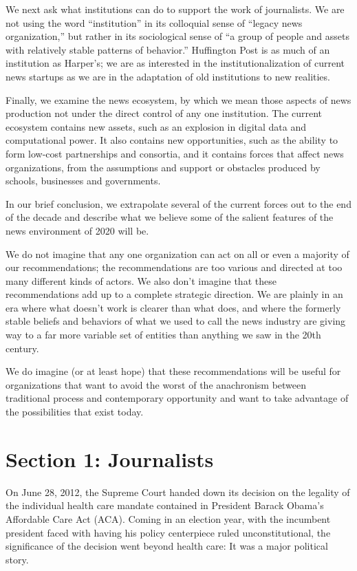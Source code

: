 We next ask what institutions can do to support the work of journalists. We are
not using the word ``institution'' in its colloquial sense of ``legacy news organization,''
but rather in its sociological sense of ``a group of people and assets with
relatively stable patterns of behavior.'' Huffington Post is as much of an institution
as Harper’s; we are as interested in the institutionalization of current news
startups as we are in the adaptation of old institutions to new realities.

Finally, we examine the news ecosystem, by which we mean those aspects of
news production not under the direct control of any one institution. The current
ecosystem contains new assets, such as an explosion in digital data and computational
power. It also contains new opportunities, such as the ability to form
low-cost partnerships and consortia, and it contains forces that affect news organizations,
from the assumptions and support or obstacles produced by schools,
businesses and governments.

In our brief conclusion, we extrapolate several of the current forces out to the
end of the decade and describe what we believe some of the salient features of
the news environment of 2020 will be.

We do not imagine that any one organization can act on all or even a majority
of our recommendations; the recommendations are too various and directed at
too many different kinds of actors. We also don’t imagine that these recommendations
add up to a complete strategic direction. We are plainly in an era where
what doesn’t work is clearer than what does, and where the formerly stable
beliefs and behaviors of what we used to call the news industry are giving way
to a far more variable set of entities than anything we saw in the 20th century.

We do imagine (or at least hope) that these recommendations will be useful for
organizations that want to avoid the worst of the anachronism between traditional
process and contemporary opportunity and want to take advantage of the
possibilities that exist today.

\chapter{Section 1: Journalists}
On June 28, 2012, the Supreme Court handed down its decision on the legality of
the individual health care mandate contained in President Barack Obama’s Affordable
Care Act (ACA). Coming in an election year, with the incumbent president
faced with having his policy centerpiece ruled unconstitutional, the significance of
the decision went beyond health care: It was a major political story.

